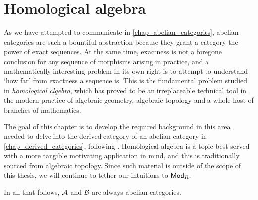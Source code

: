 \chapter{Homological algebra}
\label{chap_homological}

As we have attempted to communicate in
\cref{chap_abelian_categories}, abelian categories are such a
bountiful abstraction because they grant a category the power of
exact sequences.
At the same time, exactness is not a foregone conclusion for any
sequence of morphisms arising in practice, and a mathematically
interesting problem in its own right is to attempt to understand `how
far' from exactness a sequence is.
This is the fundamental problem studied in \emph{homological
algebra}, which has proved to be an irreplaceable technical tool in
the modern practice of algebraic geometry, algebraic topology and a
whole host of branches of mathematics.

The goal of this chapter is to develop the required background in
this area needed to delve into the derived category of an abelian
category in \cref{chap_derived_categories}, following \cite{weibel}.
Homological algebra is a topic best served with a more tangible
motivating application in mind, and this is traditionally sourced
from algebraic topology.
Since such material is outside of the scope of this thesis, we will
continue to tether our intuitions to ${\mathsf{Mod}}_{{R}}$.

In all that follows, $\mathcal{A}$ and $\mathcal{B}$ are always abelian categories.






